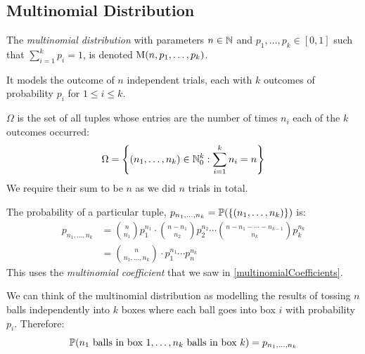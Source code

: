 \documentclass[../main.tex]{subfiles}
\begin{document}
\subsection{Multinomial Distribution}
\begin{definition}
  The \textit{multinomial distribution} with parameters $n \in \N$ and $p_1, \ldots, p_k \in [0, 1]$ such that $\sum_{i = 1}^{k} p_i = 1$, is denoted $\multinomial(n, p_1, \ldots, p_k)$.

  It models the outcome of $n$ independent trials, each with $k$ outcomes of probability $p_i$ for $1 \leq i \leq k$.

  $\Omega$ is the set of all tuples whose entries are the number of times $n_i$ each of the $k$ outcomes occurred:
  \[
    \Omega = \left\{(n_1, \ldots, n_k) \in \N^{k}_0 : \sum_{i = 1}^{k} n_i = n\right\}
  \]
  We require their sum to be $n$ as we did $n$ trials in total.

  The probability of a particular tuple, $p_{n_1, \ldots, n_k} = \P(\{(n_1, \ldots, n_k)\})$ is:
  \begin{align*}
    p_{n_1, \ldots, n_k} &= \binom{n}{n_1}p^{n_1}_{1} \cdot \binom{n - n_1}{n_2}p^{n_2}_{2} \cdots \binom{n - n_1 - \cdots - n_{k - 1}}{n_k} p^{n_k}_{k} \\
                         &= \binom{n}{n_1, \ldots, n_k} \cdot p^{n_1}_{1} \cdots p^{n_k}_{n}
  \end{align*}
  This uses the \textit{multinomial coefficient} that we saw in \cref{multinomialCoefficients}.
\end{definition}
\begin{remark}[Intuition]
  We can think of the multinomial distribution as modelling the results of tossing $n$ balls independently into $k$ boxes where each ball goes into box $i$ with probability $p_i$.
  Therefore:
  \[
    \P(n_1 \text{ balls in box 1}, \ldots, n_k \text{ balls in box $k$}) = p_{n_1, \ldots, n_k}
  \]
\end{remark}
\end{document}
